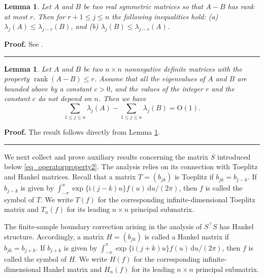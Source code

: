 \documentclass[11pt]{article}
\newtheorem{lemma}[theorem]{Lemma}
\newenvironment{proof}[1][Proof]{\noindent\textbf{#1.} }{\ \rule{0.5em}{0.5em}}
\numberwithin{equation}{section}
\numberwithin{figure}{section}
\begin{document}
\begin{lemma}\label{thm_aux_interlacing}
\noindent Let $A$ and $B$ be two real symmetric matrices so that $A-B$ has rank at most $r$. Then for $r+1\leq j\leq n$ the following inequalities hold:  (a) $\lambda_{j}(A)\leq\lambda_{j-r}(B)$, and (b) $\lambda
_{j}(B)\leq\lambda_{j-r}(A)$.
\end{lemma}
\begin{proof}
See \cite[Theorem 4.3.6]{horn_johnson1985matrix}. 
\end{proof}


\begin{lemma}\label{lem_aux_trace_rank}
Let $A$ and $B$ be two $n \times n$ nonnegative definite matrices with the
property $\operatorname{rank}(A-B)\leq r$. Assume that all the eigenvalues of $A$ and $B$
are bounded above by a constant $c>0$, and the values of the
integer $r$ and the constant $c$ do not depend on $n$. Then we have
\[
\sum_{1\leq j\leq n}\lambda_{j}(A)-\sum_{1\leq j\leq n}\lambda_{j}(B)=\mathrm{O}(1). 
\]
\end{lemma}
\begin{proof}
The result follows directly from Lemma \ref{thm_aux_interlacing}. 
\end{proof}


We next collect and prove auxiliary results concerning the matrix \(S\) introduced below \eqref{eq_operatorproperty2}. The analysis relies on its connection with Toeplitz and Hankel matrices. Recall that a matrix \(T=(b_{jk})\) is Toeplitz if \(b_{jk}=b_{j-k}\). If \(b_{j-k}\) is given by \(\int_{-\pi}^{\pi}\exp\{\mathrm{i}(j-k)u\}f(u)\,\mathrm{d}u/(2\pi)\), then \(f\) is called the symbol of \(T\). We write \(T(f)\) for the corresponding infinite-dimensional Toeplitz matrix and \(T_n(f)\) for its leading \(n\times n\) principal submatrix.

The finite-sample boundary correction arising in the analysis of \(S^\top S\) has Hankel structure. Accordingly, a matrix \(H=(b_{jk})\) is called a Hankel matrix if \(b_{jk}=b_{j+k}\). If \(b_{j+k}\) is given by \(\int_{-\pi}^{\pi}\exp\{\mathrm{i}(j+k)u\}f(u)\,\mathrm{d}u/(2\pi)\), then \(f\) is called the symbol of \(H\). We write \(H(f)\) for the corresponding infinite-dimensional Hankel matrix and \(H_n(f)\) for its leading \(n\times n\) principal submatrix.
\end{document}
